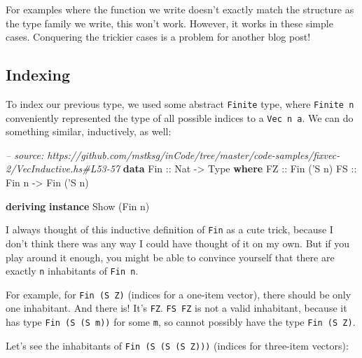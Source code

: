 \documentclass[]{article}
\newenvironment{Shaded}{}{}
\newcommand{\KeywordTok}[1]{\textcolor[rgb]{0.00,0.44,0.13}{\textbf{#1}}}
\newcommand{\DataTypeTok}[1]{\textcolor[rgb]{0.56,0.13,0.00}{#1}}
\newcommand{\CharTok}[1]{\textcolor[rgb]{0.25,0.44,0.63}{#1}}
\newcommand{\CommentTok}[1]{\textcolor[rgb]{0.38,0.63,0.69}{\textit{#1}}}
\newcommand{\OtherTok}[1]{\textcolor[rgb]{0.00,0.44,0.13}{#1}}
\newcommand{\NormalTok}[1]{#1}
\begin{document}
For examples where the function we write doesn't exactly match the structure as
the type family we write, this won't work. However, it works in these simple
cases. Conquering the trickier cases is a problem for another blog post!

\subsection{Indexing}\label{indexing-1}

To index our previous type, we used some abstract \texttt{Finite} type, where
\texttt{Finite\ n} conveniently represented the type of all possible indices to
a \texttt{Vec\ n\ a}. We can do something similar, inductively, as well:

\begin{Shaded}
\begin{Highlighting}[]
\CommentTok{-- source: https://github.com/mstksg/inCode/tree/master/code-samples/fixvec-2/VecInductive.hs#L53-57}
\KeywordTok{data} \DataTypeTok{Fin}\OtherTok{ ::} \DataTypeTok{Nat} \OtherTok{->} \DataTypeTok{Type} \KeywordTok{where}
    \DataTypeTok{FZ}\OtherTok{ ::} \DataTypeTok{Fin}\NormalTok{ (}\CharTok{'S n)}
    \DataTypeTok{FS}\OtherTok{ ::} \DataTypeTok{Fin}\NormalTok{ n }\OtherTok{->} \DataTypeTok{Fin}\NormalTok{ (}\CharTok{'S n)}

\KeywordTok{deriving} \KeywordTok{instance} \DataTypeTok{Show}\NormalTok{ (}\DataTypeTok{Fin}\NormalTok{ n)}
\end{Highlighting}
\end{Shaded}

I always thought of this inductive definition of \texttt{Fin} as a cute trick,
because I don't think there was any way I could have thought of it on my own.
But if you play around it enough, you might be able to convince yourself that
there are exactly \texttt{n} inhabitants of \texttt{Fin\ n}.

For example, for \texttt{Fin\ (\textquotesingle{}S\ \textquotesingle{}Z)}
(indices for a one-item vector), there should be only one inhabitant. And there
is! It's \texttt{FZ}. \texttt{FS\ FZ} is not a valid inhabitant, because it has
type \texttt{Fin\ (\textquotesingle{}S\ (\textquotesingle{}S\ m))} for some
\texttt{m}, so cannot possibly have the type
\texttt{Fin\ (\textquotesingle{}S\ \textquotesingle{}Z)}.

Let's see the inhabitants of
\texttt{Fin\ (\textquotesingle{}S\ (\textquotesingle{}S\ (\textquotesingle{}S\ \textquotesingle{}Z)))}
(indices for three-item vectors):
\end{document}
